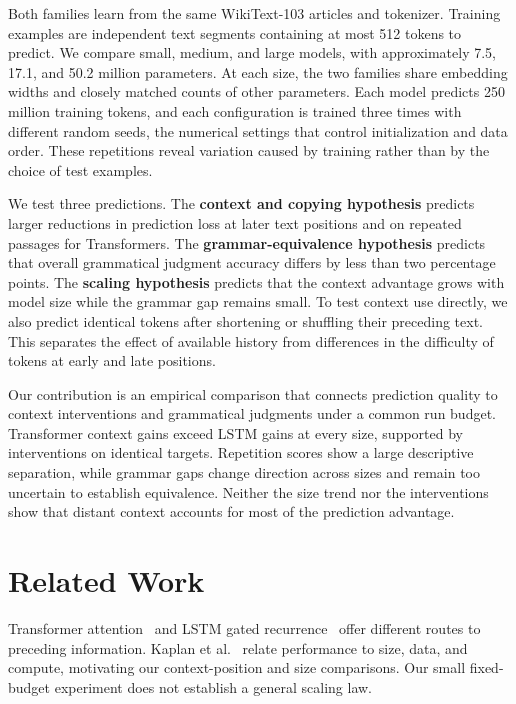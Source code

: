 \documentclass[10pt]{article}
\begin{document}
Both families learn from the same WikiText-103 articles and tokenizer. Training examples are independent text segments containing at most 512 tokens to predict. We compare small, medium, and large models, with approximately 7.5, 17.1, and 50.2 million parameters. At each size, the two families share embedding widths and closely matched counts of other parameters. Each model predicts 250 million training tokens, and each configuration is trained three times with different random seeds, the numerical settings that control initialization and data order. These repetitions reveal variation caused by training rather than by the choice of test examples.

We test three predictions. The \textbf{context and copying hypothesis} predicts larger reductions in prediction loss at later text positions and on repeated passages for Transformers. The \textbf{grammar-equivalence hypothesis} predicts that overall grammatical judgment accuracy differs by less than two percentage points. The \textbf{scaling hypothesis} predicts that the context advantage grows with model size while the grammar gap remains small. To test context use directly, we also predict identical tokens after shortening or shuffling their preceding text. This separates the effect of available history from differences in the difficulty of tokens at early and late positions.

Our contribution is an empirical comparison that connects prediction quality to context interventions and grammatical judgments under a common run budget. Transformer context gains exceed LSTM gains at every size, supported by interventions on identical targets. Repetition scores show a large descriptive separation, while grammar gaps change direction across sizes and remain too uncertain to establish equivalence. Neither the size trend nor the interventions show that distant context accounts for most of the prediction advantage.

\section{Related Work}

Transformer attention~\cite{vaswani2017attention} and LSTM gated recurrence~\cite{hochreiter1997lstm} offer different routes to preceding information. Kaplan et al.~\cite{kaplan2020scaling} relate performance to size, data, and compute, motivating our context-position and size comparisons. Our small fixed-budget experiment does not establish a general scaling law.
\end{document}
